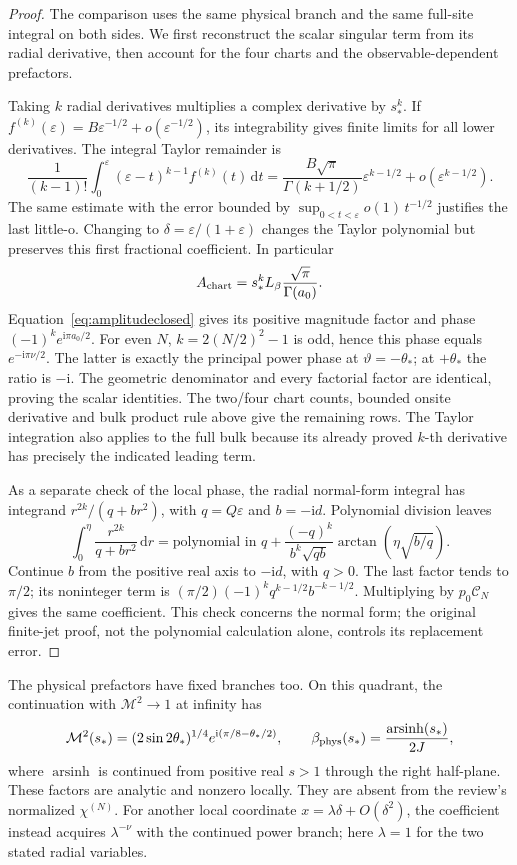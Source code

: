 \documentclass[11pt]{article}
\numberwithin{equation}{section}
\theoremstyle{definition}
\newcommand{\dd}{\,\mathrm d}
\newcommand{\ii}{\mathrm i}
\newcommand{\eps}{\varepsilon}
\newcommand{\M}{\mathcal M}
\begin{document}
\begin{proof}
The comparison uses the same physical branch and the same full-site integral on both sides. We first reconstruct the scalar singular term from its radial derivative, then account for the four charts and the observable-dependent prefactors.

Taking \(k\) radial derivatives multiplies a complex derivative by
\(s_*^k\). If \(f^{(k)}(\eps)=B\eps^{-1/2}+o(\eps^{-1/2})\),
its integrability gives finite limits for all lower derivatives.
The integral Taylor remainder is
\[
 \frac1{(k-1)!}\int_0^\eps(\eps-t)^{k-1}f^{(k)}(t)\dd t
 =\frac{B\sqrt\pi}{\Gamma(k+1/2)}\eps^{k-1/2}
       +o(\eps^{k-1/2}).
\]
The same estimate with the error bounded by
\(\sup_{0<t<\eps}o(1)\,t^{-1/2}\) justifies the last little-o.
Changing to \(\delta=\eps/(1+\eps)\) changes the Taylor polynomial
but preserves this first fractional coefficient. In particular
\[
 A_{\rm chart}=s_*^kL_\beta\frac{\sqrt\pi}{\Gamma(a_0)}.
\]
Equation~\eqref{eq:amplitudeclosed} gives its positive magnitude
factor and phase \((-1)^ke^{\ii\pi a_0/2}\).
For even \(N\), \(k=2(N/2)^2-1\) is odd, hence this phase equals
\(e^{-\ii\pi\nu/2}\). The latter is exactly the principal power
phase at \(\vartheta=-\theta_*\); at \(+\theta_*\) the ratio is
\(-\ii\). The geometric denominator and every factorial factor
are identical, proving the scalar identities.
The two/four chart counts, bounded onsite derivative and bulk
product rule above give the remaining rows. The Taylor integration
also applies to the full bulk because its already proved \(k\)-th
derivative has precisely the indicated leading term.

As a separate check of the local phase, the radial normal-form
integral has integrand \(r^{2k}/(q+b r^2)\), with \(q=Q\eps\)
and \(b=-\ii d\). Polynomial division leaves
\[
 \int_0^\eta\frac{r^{2k}}{q+b r^2}\dd r
 =\text{polynomial in }q+
 \frac{(-q)^k}{b^k\sqrt{qb}}
             \arctan\!\left(\eta\sqrt{b/q}\right).
\]
Continue \(b\) from the positive real axis to \(-\ii d\), with
\(q>0\). The last factor tends to \(\pi/2\); its noninteger term
is \((\pi/2)(-1)^kq^{k-1/2}b^{-k-1/2}\).
Multiplying by \(p_0\mathscr C_N\) gives the same coefficient.
This check concerns the normal form; the original finite-jet proof,
not the polynomial calculation alone, controls its replacement error.
\end{proof}

The physical prefactors have fixed branches too. On this quadrant,
the continuation with \(\M^2\to1\) at infinity has
\[
 \M^2(s_*)=(2\sin2\theta_*)^{1/4}
             e^{\ii(\pi/8-\theta_*/2)},\qquad
 \beta_{\rm phys}(s_*)=\frac{\operatorname{arsinh}(s_*)}{2J},
\]
where \(\operatorname{arsinh}\) is continued from positive real
\(s>1\) through the right half-plane. These factors are analytic
and nonzero locally. They are absent from the review's normalized
\(\chi^{(N)}\). For another local coordinate
\(x=\lambda\delta+O(\delta^2)\), the coefficient instead acquires
\(\lambda^{-\nu}\) with the continued power branch; here
\(\lambda=1\) for the two stated radial variables.
\end{document}
